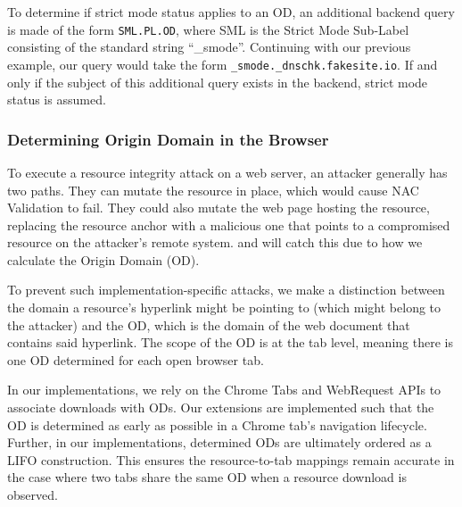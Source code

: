 To determine if strict mode status applies to an OD, an additional backend query
is made of the form \texttt{SML.PL.OD}, where SML is the Strict Mode Sub-Label
consisting of the standard string ``\_smode''. Continuing with our previous
example, our query would take the form \texttt{\_smode.\_dnschk.fakesite.io}. If
and only if the subject of this additional query exists in the backend, strict
mode status is assumed.

\subsubsection{Determining Origin Domain in the Browser}

To execute a resource integrity attack on a web server, an attacker generally
has two paths. They can mutate the resource in place, which would cause NAC
Validation to fail. They could also mutate the web page hosting the resource,
replacing the resource anchor with a malicious one that points to a compromised
resource on the attacker's remote system. \DNSSYS{} and \DHTSYS{} will catch
this due to how we calculate the Origin Domain (OD).

To prevent such implementation-specific attacks, we make a distinction between
the domain a resource's hyperlink might be pointing to (which might belong to
the attacker) and the OD, which is the domain of the web document that contains
said hyperlink. The scope of the OD is at the tab level, meaning there is one OD
determined for each open browser tab.

In our implementations, we rely on the Chrome Tabs and
WebRequest APIs to associate downloads with ODs. Our extensions are implemented
such that the OD is determined as early as possible in a Chrome tab's navigation
lifecycle. Further, in our implementations, determined ODs are ultimately
ordered as a LIFO construction. This ensures the resource-to-tab mappings remain
accurate in the case where two tabs share the same OD when a resource download
is observed.
